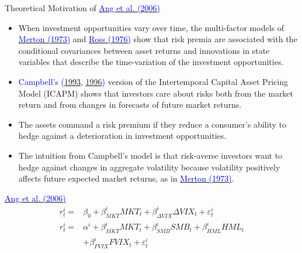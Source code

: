 \documentclass{beamer}
\begin{document}
\begin{frame}{Theoretical Motivation of \href{https://doi.org/10.1111/j.1540-6261.2006.00836.x}{\textcolor{blue}{Ang et al. (2006)}}}
	\begin{itemize}
		\item When investment opportunities vary over time, the multi-factor models of \href{https://doi.org/10.2307/1913811}{\textcolor{blue}{Merton (1973)}} and \href{https://doi.org/10.1016/0022-0531(76)90046-6}{\textcolor{blue}{Ross (1976)}} show that risk premia are associated with the conditional covariances between asset returns and innovations in state variables that describe the time-variation of the investment opportunities.
		\item \textcolor{blue}{Campbell’s (\href{https://www.jstor.org/stable/2117530}{1993}, \href{https://doi.org/10.1086/262026}{1996})} version of the Intertemporal Capital Asset Pricing Model
		(ICAPM) shows that investors care about risks both from the market return and from changes in forecasts of future market returns.
		\item The assets command a risk premium if they reduce a consumer's ability to hedge against a deterioration in investment opportunities.
		\item The intuition from Campbell’s model is that risk-averse investors want to hedge against changes in aggregate volatility because volatility positively
		affects future expected market returns, as in \href{https://doi.org/10.2307/1913811}{\textcolor{blue}{Merton (1973)}}.
	\end{itemize}
\end{frame}

\begin{frame}{\href{https://doi.org/10.1111/j.1540-6261.2006.00836.x}{\textcolor{blue}{Ang et al. (2006)}}}
	\begin{equation}\label{model of ang 2006}
		\begin{aligned}
			r_{t}^{i}= & \beta_{0}+\beta_{M K T}^{i} M K T_{t}+\beta_{\Delta V I X}^{i} \Delta V I X_{t}+\varepsilon_{t}^{i} \\
			r_{t}^{i}=& \alpha^{i}+\beta_{M K T}^{i} M K T_{t}+\beta_{S M B}^{i} S M B_{t}+\beta_{H M L}^{i} H M L_{t} \\
			&+\beta_{F V I X}^{i} F V I X_{t}+\varepsilon_{t}^{i}
		\end{aligned}
	\end{equation}
\end{frame}
\end{document}
